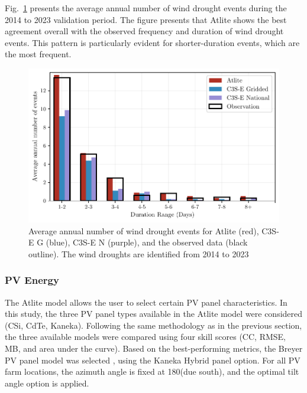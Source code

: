 \documentclass[preprint, 12pt, authoryear]{elsarticle}
\begin{document}
Fig.~\ref{fig:bar_number_events_verification_wind} presents the average annual number of wind drought events during the 2014 to 2023 validation period. The figure presents that Atlite shows the best agreement overall with the observed frequency and duration of wind drought events. This pattern is particularly evident for shorter-duration events, which are the most frequent.

\begin{figure}[!ht]
	\centering
	\includegraphics[width=\textwidth]{verification_wind_number_events.pdf}
	\caption{Average annual number of wind drought events for Atlite (red), C3S-E G (blue), C3S-E N (purple), and the observed data (black outline). The wind droughts are identified from 2014 to 2023}
	\label{fig:bar_number_events_verification_wind}
\end{figure}

\newpage
\subsubsection{PV Energy}
\label{sec:pv_verification}

The Atlite model allows the user to select certain PV panel characteristics. In this study, the three PV panel types available in the Atlite model were considered (CSi, CdTe, Kaneka). Following the same methodology as in the previous section, the three available models were compared using four skill scores (CC, RMSE, MB, and area under the curve). Based on the best-performing metrics, the Breyer PV panel model was selected \citep{beyer2004pv}, using the Kaneka Hybrid panel option. For all PV farm locations, the azimuth angle is fixed at 180\textdegree (due south), and the optimal tilt angle option is applied. 
\end{document}
